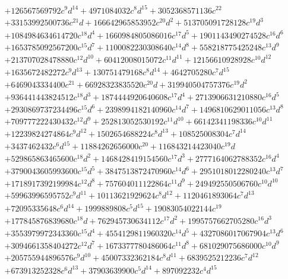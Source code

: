 {\begin{align*}
&+126567569792c^{9}d^{14}+4971084032c^{8}d^{15}+3052368571136c^{22}\\
&+33153992500736c^{21}d+166642965853952c^{20}d^{2}+513705091728128c^{19}d^{3}\\
&+1084984634614720c^{18}d^{4}+1660984805086016c^{17}d^{5}+1901143490274528c^{16}d^{6}\\
&+1653785092567200c^{15}d^{7}+1100082230308640c^{14}d^{8}+558218775425248c^{13}d^{9}\\
&+213707028478880c^{12}d^{10}+60412008015072c^{11}d^{11}+12156610928928c^{10}d^{12}\\
&+1635672482272c^{9}d^{13}+130751479168c^{8}d^{14}+4642705280c^{7}d^{15}\\
&+6469043334400c^{21}+66928323835520c^{20}d+319940504757376c^{19}d^{2}\\
&+936441443824512c^{18}d^{3}+1874444920640608c^{17}d^{4}+2713906631210880c^{16}d^{5}\\
&+2930869737234496c^{15}d^{6}+2398994182140960c^{14}d^{7}+1496810629011056c^{13}d^{8}\\
&+709777222430432c^{12}d^{9}+252813052530192c^{11}d^{10}+66142341198336c^{10}d^{11}\\
&+12239824274864c^{9}d^{12}+1502654688224c^{8}d^{13}+108525008304c^{7}d^{14}\\
&+3437462432c^{6}d^{15}+11884262656000c^{20}+116843214423040c^{19}d\\
&+529865863465600c^{18}d^{2}+1468428419154560c^{17}d^{3}+2777164062788352c^{16}d^{4}\\
&+3790043605993600c^{15}d^{5}+3847513872470960c^{14}d^{6}+2951018012280240c^{13}d^{7}\\
&+1718917392199984c^{12}d^{8}+757604011122864c^{11}d^{9}+249492550506760c^{10}d^{10}\\
&+59963996595752c^{9}d^{11}+10113621929624c^{8}d^{12}+1120461893064c^{7}d^{13}\\
&+72095335648c^{6}d^{14}+1999889808c^{5}d^{15}+19083054022144c^{19}\\
&+177845876839680c^{18}d+762945730634112c^{17}d^{2}+1995757662705280c^{16}d^{3}\\
&+3553979972343360c^{15}d^{4}+4554129811960320c^{14}d^{5}+4327086017067904c^{13}d^{6}\\
&+3094661358404272c^{12}d^{7}+1673377780486064c^{11}d^{8}+681029075686000c^{10}d^{9}\\
&+205755944896576c^{9}d^{10}+45007332362184c^{8}d^{11}+6839525212236c^{7}d^{12}\\
&+673913252328c^{6}d^{13}+37903639900c^{5}d^{14}+897092232c^{4}d^{15}\\

\end{align*}}

